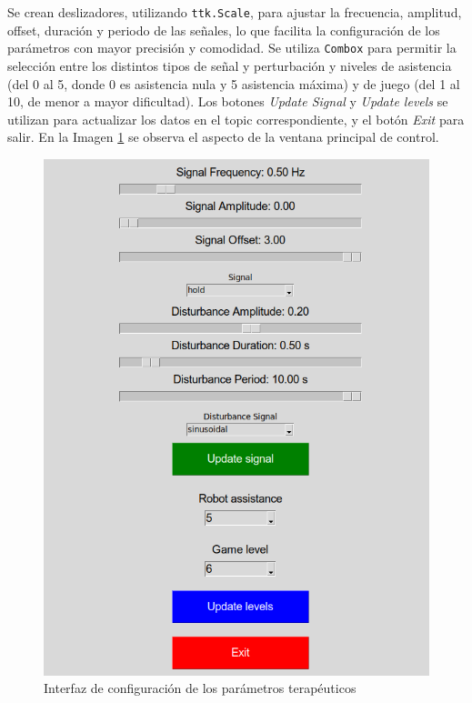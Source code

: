 Se crean deslizadores, utilizando \verb|ttk.Scale|, para ajustar la frecuencia, amplitud, offset, duración y periodo de las señales, lo que facilita la configuración de los parámetros con mayor precisión y comodidad.
Se utiliza \verb|Combox| para permitir la selección entre los distintos tipos de señal y perturbación y niveles de asistencia (del 0 al 5, donde 0 es asistencia nula y 5 asistencia máxima) y de juego (del 1 al 10, de menor a mayor dificultad).
Los botones \textit{Update Signal} y \textit{Update levels} se utilizan para actualizar los datos en el topic correspondiente, y el botón \textit{Exit} para salir.
En la Imagen \ref{fig:control} se observa el aspecto de la ventana principal de control.

\begin{figure}[ht!]
	\centering
	\begin{minipage}{0.55\linewidth}
		\centering
		\includegraphics[width=\linewidth]{figs/control_pannel.png}
	\end{minipage}
	\caption[Interfaz de configuración de los parámetros terapéuticos]{Interfaz de configuración de los parámetros terapéuticos}
	\label{fig:control}
\end{figure}

